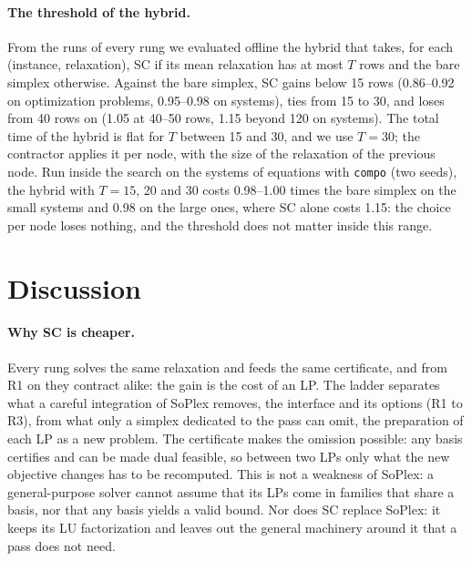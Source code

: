 \documentclass[11pt]{article}
\theoremstyle{definition}
\theoremstyle{remark}
\begin{document}
\paragraph{The threshold of the hybrid.}
From the runs of every rung we evaluated offline the hybrid that takes, for
each (instance, relaxation), SC if its mean relaxation has at most $T$ rows
and the bare simplex otherwise. Against the bare simplex, SC gains below 15
rows (0.86--0.92 on optimization problems, 0.95--0.98 on systems), ties from
15 to 30, and loses from 40 rows on (1.05 at 40--50 rows, 1.15 beyond 120 on
systems). The total time of the hybrid is flat for $T$ between 15 and 30, and
we use $T=30$; the contractor applies it per node, with the size of the
relaxation of the previous node. Run inside the search on the systems of
equations with \texttt{compo} (two seeds), the hybrid with $T=15$, 20 and 30
costs 0.98--1.00 times the bare simplex on the small systems and 0.98 on the
large ones, where SC alone costs 1.15: the choice per node loses nothing, and
the threshold does not matter inside this range.

\section{Discussion}\label{sec:discussion}

\paragraph{Why SC is cheaper.} Every rung solves the same relaxation and feeds the
same certificate, and from R1 on they contract alike: the gain is the cost of
an LP. The ladder separates what a careful integration of SoPlex removes, the
interface and its options (R1 to R3), from what only a simplex dedicated to the
pass can omit, the preparation of each LP as a new problem. The certificate
makes the omission possible: any basis certifies and can be made dual
feasible, so between two LPs only what the new objective changes has to be
recomputed. This is not a weakness of SoPlex: a general-purpose solver cannot
assume that its LPs come in families that share a basis, nor that any basis
yields a valid bound. Nor does SC replace SoPlex: it keeps its LU
factorization and leaves out the general machinery around it that a pass does
not need.
\end{document}
